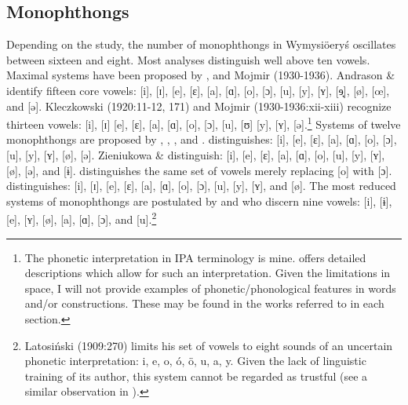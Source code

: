 \documentclass[output=paper]{langscibook}
\begin{document}
\subsection{Monophthongs}\label{sec:wymsorys:3.1}


Depending on the study, the number of monophthongs in Wymysiöeryś oscillates between sixteen and eight. Most analyses distinguish well above ten vowels. Maximal systems have been proposed by \citet{AndrasonKról2016}, \citet{Kleczkowski1920} and Mojmir (1930-1936). Andrason \& \citet[20]{Król2016} identify fifteen core vowels: [i], [ɪ], [e], [ɛ], [a], [ɑ], [o], [ɔ], [u], [y], [ʏ], [ɘ̟], [ø], [œ], and [ə]. Kleczkowski (1920:11-12, 171) and Mojmir (1930-1936:xii-xiii) recognize thirteen vowels: [i], [ɪ] [e], [ɛ], [a], [ɑ], [o], [ɔ], [u], [ʊ] [y], [ʏ], [ə].\footnote{The phonetic interpretation in IPA terminology is mine. \citet{Kleczkowski1920} offers detailed descriptions which allow for such an interpretation. Given the limitations in space, I will not provide examples of phonetic/phonological features in words and/or constructions. These may be found in the works referred to in each section.} Systems of twelve monophthongs are proposed by \citet{Lasatowicz1992}, \citet{ZieniukowaWicherkiewicz2001}, \citet{Wicherkiewicz2003}, and \citet{Andrason2014b}. \citet[32-41]{Lasatowicz1992} distinguishes: [i], [e], [ɛ], [a], [ɑ], [o], [ɔ], [u], [y], [ʏ], [ø], [ə]. Zieniukowa \& \citet[499-500]{Wicherkiewicz2001} distinguish: [i], [e], [ɛ], [a], [ɑ], [o], [u], [y], [ʏ], [ø], [ə], and [ɨ]. \citet[407]{Wicherkiewicz2003} distinguishes the same set of vowels merely replacing [o] with [ɔ]. \citet[126-127]{Andrason2014b} distinguishes: [i], [ɪ], [e], [ɛ], [a], [ɑ], [o], [ɔ], [u], [y], [ʏ], and [ø]. The most reduced systems of monophthongs are postulated by \citet{Weckwerth2015} and \citet{Ritchie2012} who discern nine vowels: [i], [ɨ], [e], [ʏ], [ø], [a], [ɑ], [ɔ], and [u].\footnote{Latosiński (1909:270) limits his set of vowels to eight sounds of an uncertain phonetic interpretation: i, e, o, ó, ö, u, a, y. Given the lack of linguistic training of its author, this system cannot be regarded as trustful (see a similar observation in \citealt{Wicherkiewicz2003}).}
\end{document}

